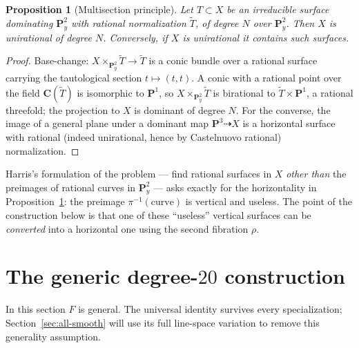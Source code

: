 \documentclass[11pt]{amsart}
\newtheorem{proposition}[theorem]{Proposition}
\theoremstyle{definition}
\theoremstyle{remark}
\newcommand{\PP}{\mathbf{P}}
\newcommand{\CC}{\mathbf{C}}
\begin{document}
\begin{proposition}[Multisection principle]\label{prop:engine}
Let $T\subset X$ be an irreducible surface dominating $\PP^2_y$ with
rational normalization $\widetilde T$, of degree $N$ over $\PP^2_y$.  Then
$X$ is unirational of degree $N$.  Conversely, if $X$ is unirational it
contains such surfaces.
\end{proposition}

\begin{proof}
Base-change: $X\times_{\PP^2_y}\widetilde T\to\widetilde T$ is a conic
bundle over a rational surface carrying the tautological section
$t\mapsto(t,t)$.  A conic with a rational point over the field
$\CC(\widetilde T)$ is isomorphic to $\PP^1$, so
$X\times_{\PP^2_y}\widetilde T$ is birational to
$\widetilde T\times\PP^1$, a rational threefold; the projection to $X$ is
dominant of degree $N$.  For the converse, the image of a general plane
under a dominant map $\PP^3\dashrightarrow X$ is a horizontal surface with
rational (indeed unirational, hence by Castelnuovo rational)
normalization.
\end{proof}

Harris's formulation of the problem
--- find rational surfaces in $X$ \emph{other than} the preimages of
rational curves in $\PP^2_y$ \cite[p.~24]{Harris} --- asks exactly for the
horizontality in Proposition~\ref{prop:engine}: the preimage
$\pi^{-1}(\text{curve})$ is vertical and useless.  The point of the
construction below is that one of these ``useless'' vertical surfaces can
be \emph{converted} into a horizontal one using the second fibration
$\rho$.

\section{The generic degree-$20$ construction}\label{sec:construction}

In this section $F$ is general.  The universal identity survives every
specialization; Section~\ref{sec:all-smooth} will use its full line-space
variation to remove this generality assumption.
\end{document}

